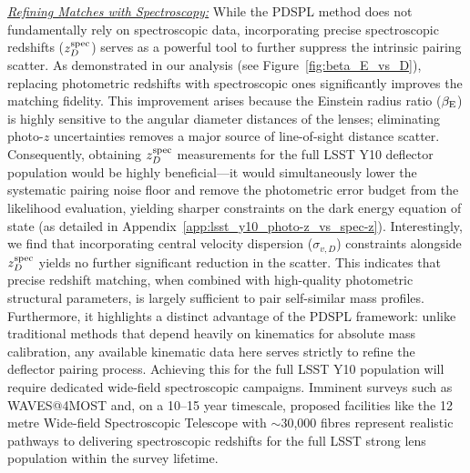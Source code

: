 \documentclass[a4paper,11pt]{article}
\begin{document}
\noindent \underline{\textit{Refining Matches with Spectroscopy:}}
While the PDSPL method does not fundamentally rely on spectroscopic data, incorporating precise spectroscopic redshifts ($z_{D}^{\rm spec}$) serves as a powerful tool to further suppress the intrinsic pairing scatter. As demonstrated in our analysis (see Figure~\ref{fig:beta_E_vs_D}), replacing photometric redshifts with spectroscopic ones significantly improves the matching fidelity. This improvement arises because the Einstein radius ratio ($\beta_{\rm E}$) is highly sensitive to the angular diameter distances of the lenses; eliminating photo-$z$ uncertainties removes a major source of line-of-sight distance scatter. Consequently, obtaining $z_{D}^{\rm spec}$ measurements for the full LSST Y10 deflector population would be highly beneficial—it would simultaneously lower the systematic pairing noise floor and remove the photometric error budget from the likelihood evaluation, yielding sharper constraints on the dark energy equation of state (as detailed in Appendix~\ref{app:lsst_y10_photo-z_vs_spec-z}). Interestingly, we find that incorporating central velocity dispersion ($\sigma_{v,D}$) constraints alongside $z_{D}^{\rm spec}$ yields no further significant reduction in the scatter. This indicates that precise redshift matching, when combined with high-quality photometric structural parameters, is largely sufficient to pair self-similar mass profiles. Furthermore, it highlights a distinct advantage of the PDSPL framework: unlike traditional methods that depend heavily on kinematics for absolute mass calibration, any available kinematic data here serves strictly to refine the deflector pairing process. Achieving this for the full LSST Y10 population will require dedicated wide-field spectroscopic campaigns. Imminent surveys such as WAVES@4MOST 
\cite{Kaur_WAVES_4MOST:2025} and, on a 10--15 year timescale, proposed facilities like the 12 metre Wide-field Spectroscopic Telescope \citep[WST;][]{WST2024} with 
$\sim$30,000 fibres represent realistic pathways to delivering spectroscopic redshifts for the full LSST strong lens population within the survey lifetime.
\end{document}
